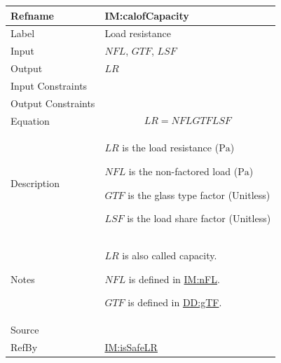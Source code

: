 \documentclass[12pt]{article}
\begin{document}
\medskip
\noindent
\begin{minipage}{\textwidth}
\begin{tabular}{>{\raggedright}p{}>{\raggedright\arraybackslash}p{}}
\toprule \textbf{Refname} & \textbf{IM:calofCapacity}
\label{IM:calofCapacity}
\\ \midrule
Label & Load resistance
        
\\ \midrule
Input & $\mathit{NFL}$, $\mathit{GTF}$, $\mathit{LSF}$
        
\\ \midrule
Output & $\mathit{LR}$
         
\\ \midrule
Input Constraints & 
\\ \midrule
Output Constraints & 
\\ \midrule
Equation & \begin{displaymath}
           \mathit{LR}=\mathit{NFL} \mathit{GTF} \mathit{LSF}
           \end{displaymath}
\\ \midrule
Description & \begin{symbDescription}
              \item{$\mathit{LR}$ is the load resistance (${\text{Pa}}$)}
              \item{$\mathit{NFL}$ is the non-factored load (${\text{Pa}}$)}
              \item{$\mathit{GTF}$ is the glass type factor (Unitless)}
              \item{$\mathit{LSF}$ is the load share factor (Unitless)}
              \end{symbDescription}
\\ \midrule
Notes & $\mathit{LR}$ is also called capacity.
        
        $\mathit{NFL}$ is defined in \hyperref[IM:nFL]{IM:nFL}.
        
        $\mathit{GTF}$ is defined in \hyperref[DD:gTF]{DD:gTF}.
        
\\ \midrule
Source & \cite{astm2009}
         
\\ \midrule
RefBy & \hyperref[IM:isSafeLR]{IM:isSafeLR}
        
\\ \bottomrule
\end{tabular}
\end{minipage}
\end{document}
